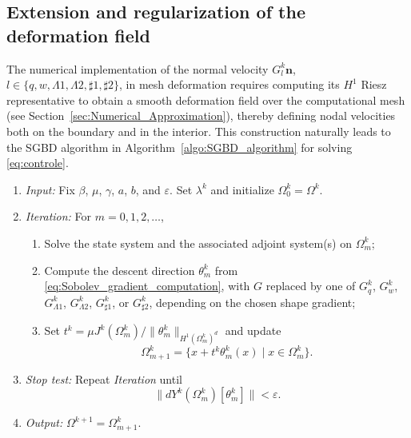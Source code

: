 \documentclass[a4paper,11pt]{article}
\newcommand{\vect}[1]{\boldsymbol{\mathbf{#1}}}
\newcommand{\VV}{\theta}
\newcommand{\nn}{\vect{n}}
\newcommand{\ADMMpara}{\gamma}
\begin{document}
%
\subsection{Extension and regularization of the deformation field}
The numerical implementation of the normal velocity $G_{l}^{k}\nn$, $l \in \{ q,w,\Lambda1, \Lambda2,\sharp1, \sharp2\}$, in mesh deformation requires computing its $H^{1}$ Riesz representative to obtain a smooth deformation field over the computational mesh (see Section~\ref{sec:Numerical_Approximation}), thereby defining nodal velocities both on the boundary and in the interior. 
This construction naturally leads to the SGBD algorithm in Algorithm~\ref{algo:SGBD_algorithm} for solving \eqref{eq:controle}.
%
%
%
%
\begin{algorithm}[h!]
\caption{SGBD algorithm for the $\omega$-subproblem \eqref{eq:controle}}\label{algo:SGBD_algorithm}
\begin{enumerate}

\item \textit{Input:} Fix ${\beta}$, $\mu$, $\ADMMpara$, $a$, $b$, and $\varepsilon$. Set $\lambda^{k}$ and initialize $\varOmega^{k}_0=\varOmega^{k}$.
%
\item \textit{Iteration:} For $m=0,1,2,\ldots$,
\begin{enumerate}\itemsep0.1em
\item[2.1] Solve the state system and the associated adjoint system(s) on $\varOmega_m^k$;
\item[2.2] Compute the descent direction $\VV_m^k$ from \eqref{eq:Sobolev_gradient_computation}, with $G$ replaced by one of $G_q^k$, $G_w^k$, $G_{\Lambda1}^k$, $G_{\Lambda2}^k$, $G_{\sharp1}^k$, or $G_{\sharp2}^k$, depending on the chosen shape gradient;
\item[2.3] Set $t^k=\mu J^{k}(\varOmega_m^k)/\|\VV_m^k\|_{H^{1}(\varOmega_m^k)^d}$ and update
\[
\varOmega_{m+1}^k=\{x+t^k \VV_m^k(x)\mid x\in \varOmega_m^k\}.
\]
\end{enumerate}

\item \textit{Stop test:} Repeat \textit{Iteration} until
\[
\|dY^{k}(\varOmega_m^k)[\VV_m^k]\|<\varepsilon.
\]

\item \textit{Output:} $\varOmega^{k+1}=\varOmega_{m+1}^k$.

\end{enumerate}
\end{algorithm}
\end{document}

